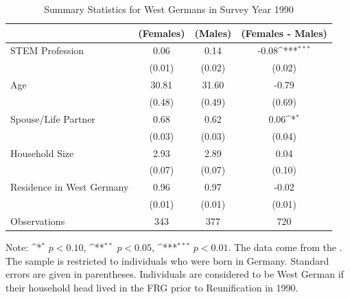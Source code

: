 \documentclass[a4paper, oneside, hyperfootnotes = false]{article}
\def\sym#1{\ifmmode^{#1}\else\(^{#1}\)\fi}
\begin{document}
{\begin{table}[ht]
    \caption{Summary Statistics for West Germans in Survey Year 1990}
    \label{tab:descr_summary_west}
    \begin{center}
        \begin{tabular}{l*{3}{c}}
        	\toprule
        	& (Females) & (Males) & (Females - Males) \\
        	\midrule
        	STEM Profession & 0.06  & 0.14 &  -0.08\sym{***}      \\
        	&   (0.01)  & (0.02) & (0.02) \\
        	\addlinespace
        	Age         & 30.81     &  31.60   &    -0.79     \\
        	&     (0.48) &        (0.49)         &      (0.69) \\
        	\addlinespace
        	Spouse/Life Partner & 0.68       &  0.62   &     0.06\sym{*}      \\
        	&      (0.03)&          (0.03)&         (0.04) \\
        	\addlinespace
        	Household Size      &  2.93   &  2.89   &    0.04       \\
        	&          (0.07)&       (0.07)        &      (0.10)\\
        	\addlinespace
        	Residence in West Germany& 0.96    &  0.97   &    -0.02        \\
        	&         (0.01) &       (0.01)&  (0.01)\\
        	\midrule
        	Observations        &        343 &     377     &       720                \\
        	\bottomrule
        \end{tabular}
        
        \vspace{2mm}
        
        \parbox{10cm}{
        \linespread{1}\footnotesize Note: \sym{*} \(p<0.10\), \sym{**} \(p<0.05\), \sym{***} \(p<0.01\). The data come from the \cite{SOEP2023}. The sample is restricted to individuals who were born in Germany. Standard errors are given in parentheses. Individuals are considered to be West German if their household head lived in the FRG prior to Reunification in 1990.}
        
    \end{center}
\end{table}

}
\end{document}
